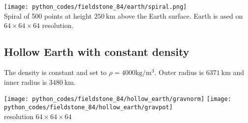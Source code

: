 \begin{center}
\texttt{[image: python\_codes/fieldstone\_84/earth/spiral.png]}\\
{\captionfont Spiral of 500 points at height $250~\si{\km}$ above the Earth surface. 
Earth is ased on $64\times 64 \times 64$ resolution.}
\end{center}


\subsection*{Hollow Earth with constant density}

The density is constant and set to $\rho=4000\si{\kg\per\cubic\metre}$. 
Outer radius is $6371~\si{\km}$ and inner radius is $3480~\si{\km}$.


\begin{center}
\texttt{[image: python\_codes/fieldstone\_84/hollow\_earth/gravnorm]}
\texttt{[image: python\_codes/fieldstone\_84/hollow\_earth/gravpot]}\\
{\captionfont resolution $64 \times 64 \times 64$}
\end{center}










